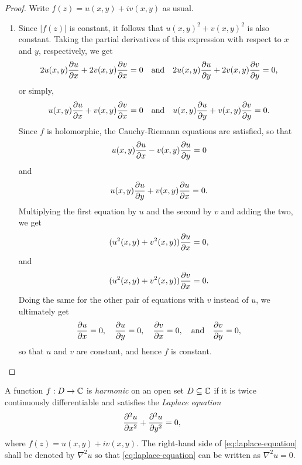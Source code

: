 \begin{proof}
    Write \(f(z) = u(x, y) + iv(x, y)\) as usual.
    \begin{enumerate}[label=(\alph*), wide]
        \item Since \(|f(z)|\) is constant, it follows that \(u(x, y)^2 + v(x, y)^2\) is also constant. Taking the partial derivatives of this expression with respect to \(x\) and \(y\), respectively, we get
        \[
            2u(x, y)\frac{\partial u}{\partial x} + 2v(x, y)\frac{\partial v}{\partial x} = 0 \quad \text{and} \quad 2u(x, y)\frac{\partial u}{\partial y} + 2v(x, y)\frac{\partial v}{\partial y} = 0,
        \]
        or simply,
        \[
            u(x, y)\frac{\partial u}{\partial x} + v(x, y)\frac{\partial v}{\partial x} = 0 \quad \text{and} \quad u(x, y)\frac{\partial u}{\partial y} + v(x, y)\frac{\partial v}{\partial y} = 0.
        \]
        Since \(f\) is holomorphic, the Cauchy-Riemann equations are satisfied, so that
        \[
            u(x, y)\frac{\partial u}{\partial x} - v(x, y)\frac{\partial u}{\partial y} = 0
        \]
        and
        \[
            u(x, y)\frac{\partial u}{\partial y} + v(x, y)\frac{\partial u}{\partial x} = 0.
        \]
        Multiplying the first equation by \(u\) and the second by \(v\) and adding the two, we get
        \[
            (u^2(x, y) + v^2(x, y))\frac{\partial u}{\partial x} = 0,
        \]
        and
        \[
            (u^2(x, y) + v^2(x, y))\frac{\partial v}{\partial x} = 0.
        \]
        Doing the same for the other pair of equations with \(v\) instead of \(u\), we ultimately get
        \[
            \frac{\partial u}{\partial x} = 0, \quad \frac{\partial u}{\partial y} = 0, \quad \frac{\partial v}{\partial x} = 0, \quad \text{and} \quad \frac{\partial v}{\partial y} = 0,
        \]
        so that \(u\) and \(v\) are constant, and hence \(f\) is constant.
    \end{enumerate}
\end{proof}

\begin{definition}
    A function \(f: D \to \mathbb{C}\) is \emph{harmonic} on an open set \(D \subseteq \mathbb{C}\) if it is twice continuously differentiable and satisfies the \emph{Laplace equation}
    \begin{equation}
        \frac{\partial ^2u}{\partial x^2} + \frac{\partial ^2u}{\partial y^2} = 0,
        \label{eq:laplace-equation}
    \end{equation}
    where \(f(z) = u(x, y) + iv(x, y)\). The right-hand side of \eqref{eq:laplace-equation} shall be denoted by \(\nabla^2 u\) so that \eqref{eq:laplace-equation} can be written as \(\nabla^2 u = 0\).
    \label{def:harmonic-function}
\end{definition}

